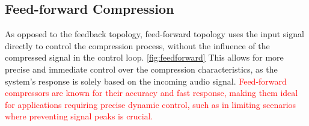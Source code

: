 \documentclass[10pt]{article}
\begin{document}
\begin{multicols*}{2}
            \subsection{Feed-forward Compression}
                As opposed to the feedback topology, feed-forward topology uses the input signal directly to control the compression process, without the influence of the compressed signal in the control loop. \ref{fig:feedforward} This allows for more precise and immediate control over the compression characteristics, as the system's response is solely based on the incoming audio signal. \textcolor{red}{Feed-forward compressors are known for their accuracy and fast response, making them ideal for applications requiring precise dynamic control, such as in limiting scenarios where preventing signal peaks is crucial.}\par

                \noindent
                \begin{minipage}{\linewidth}

                    \centering

\end{minipage}
\end{multicols*}
\end{document}

